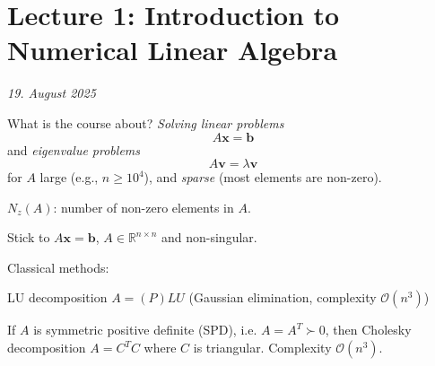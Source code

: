 \section{Lecture 1: Introduction to Numerical Linear Algebra}
\textit{19. August 2025}

What is the course about? \emph{Solving linear problems}
\begin{equation}
    A\mathbf{x} = \mathbf{b}
\end{equation}
and \emph{eigenvalue problems}
\begin{equation}
    A\mathbf{v} = \lambda \mathbf{v}
\end{equation}
for $A$ large (e.g., $n \geq 10^4$), and \emph{sparse} (most elements are non-zero).

$N_z(A)$: number of non-zero elements in $A$.

Stick to $A \mathbf{x} = \mathbf{b}$, $A \in \mathbb{R}^{n \times n}$ and non-singular.

Classical methods:

LU decomposition $A = (P)LU$ (Gaussian elimination, complexity $\mathcal{O}(n^3)$)

If $A$ is symmetric positive definite (SPD), i.e. $A = A^T \succ 0$, then Cholesky decomposition $A = C^T C$ where $C$ is triangular. Complexity $\mathcal{O}(n^3)$.

